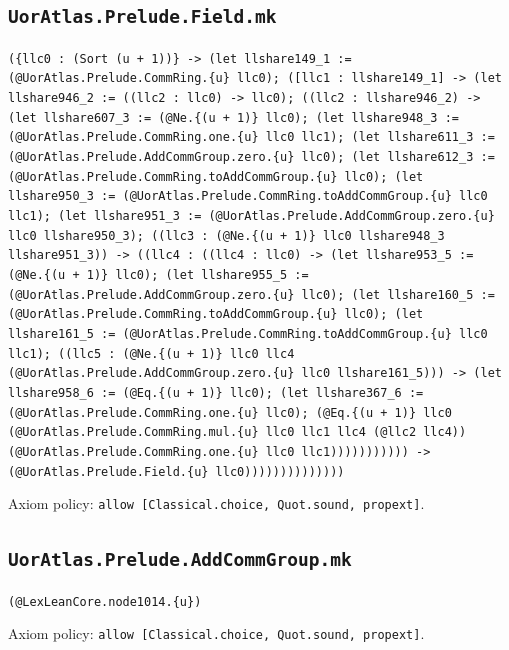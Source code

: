 \documentclass[11pt]{article}
\begin{document}
\subsection*{\texttt{UorAtlas.Prelude.Field.mk}}
\noindent\texttt{(\{llc0 : (Sort (u + 1))\} -> (let llshare149\_1 := (@UorAtlas.Prelude.CommRing.\{u\} llc0); ([llc1 : llshare149\_1] -> (let llshare946\_2 := ((llc2 : llc0) -> llc0); ((llc2 : llshare946\_2) -> (let llshare607\_3 := (@Ne.\{(u + 1)\} llc0); (let llshare948\_3 := (@UorAtlas.Prelude.CommRing.one.\{u\} llc0 llc1); (let llshare611\_3 := (@UorAtlas.Prelude.AddCommGroup.zero.\{u\} llc0); (let llshare612\_3 := (@UorAtlas.Prelude.CommRing.toAddCommGroup.\{u\} llc0); (let llshare950\_3 := (@UorAtlas.Prelude.CommRing.toAddCommGroup.\{u\} llc0 llc1); (let llshare951\_3 := (@UorAtlas.Prelude.AddCommGroup.zero.\{u\} llc0 llshare950\_3); ((llc3 : (@Ne.\{(u + 1)\} llc0 llshare948\_3 llshare951\_3)) -> ((llc4 : ((llc4 : llc0) -> (let llshare953\_5 := (@Ne.\{(u + 1)\} llc0); (let llshare955\_5 := (@UorAtlas.Prelude.AddCommGroup.zero.\{u\} llc0); (let llshare160\_5 := (@UorAtlas.Prelude.CommRing.toAddCommGroup.\{u\} llc0); (let llshare161\_5 := (@UorAtlas.Prelude.CommRing.toAddCommGroup.\{u\} llc0 llc1); ((llc5 : (@Ne.\{(u + 1)\} llc0 llc4 (@UorAtlas.Prelude.AddCommGroup.zero.\{u\} llc0 llshare161\_5))) -> (let llshare958\_6 := (@Eq.\{(u + 1)\} llc0); (let llshare367\_6 := (@UorAtlas.Prelude.CommRing.one.\{u\} llc0); (@Eq.\{(u + 1)\} llc0 (@UorAtlas.Prelude.CommRing.mul.\{u\} llc0 llc1 llc4 (@llc2 llc4)) (@UorAtlas.Prelude.CommRing.one.\{u\} llc0 llc1))))))))))) -> (@UorAtlas.Prelude.Field.\{u\} llc0))))))))))))))}\par
\noindent Axiom policy: \texttt{allow [Classical.choice, Quot.sound, propext]}.\par
\subsection*{\texttt{UorAtlas.Prelude.AddCommGroup.mk}}
\noindent\texttt{(@LexLeanCore.node1014.\{u\})}\par
\noindent Axiom policy: \texttt{allow [Classical.choice, Quot.sound, propext]}.\par
\end{document}
